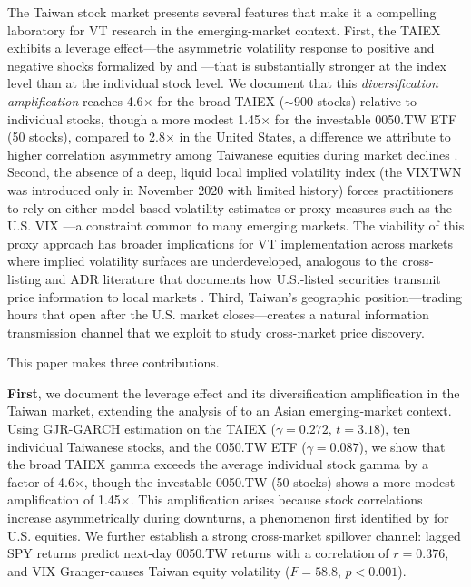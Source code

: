 The Taiwan stock market presents several features that make it a compelling laboratory for VT research in the emerging-market context. First, the TAIEX exhibits a leverage effect---the asymmetric volatility response to positive and negative shocks formalized by \citet{black1976} and \citet{glosten1993}---that is substantially stronger at the index level than at the individual stock level. We document that this \textit{diversification amplification} reaches 4.6$\times$ for the broad TAIEX ($\sim$900 stocks) relative to individual stocks, though a more modest 1.45$\times$ for the investable 0050.TW ETF (50 stocks), compared to 2.8$\times$ in the United States, a difference we attribute to higher correlation asymmetry among Taiwanese equities during market declines \citep{ang2002}. Second, the absence of a deep, liquid local implied volatility index (the VIXTWN was introduced only in November 2020 with limited history) forces practitioners to rely on either model-based volatility estimates or proxy measures such as the U.S. VIX \citep{whaley2000,whaley2009}---a constraint common to many emerging markets. The viability of this proxy approach has broader implications for VT implementation across markets where implied volatility surfaces are underdeveloped, analogous to the cross-listing and ADR literature that documents how U.S.-listed securities transmit price information to local markets \citep{gagnon2010}. Third, Taiwan's geographic position---trading hours that open after the U.S. market closes---creates a natural information transmission channel \citep{eun1989,hamao1990,lin1994} that we exploit to study cross-market price discovery.

This paper makes three contributions.

\textbf{First}, we document the leverage effect and its diversification amplification in the Taiwan market, extending the analysis of \citet{ang2002} to an Asian emerging-market context. Using GJR-GARCH estimation on the TAIEX ($\gamma = 0.272$, $t = 3.18$), ten individual Taiwanese stocks, and the 0050.TW ETF ($\gamma = 0.087$), we show that the broad TAIEX gamma exceeds the average individual stock gamma by a factor of 4.6$\times$, though the investable 0050.TW (50 stocks) shows a more modest amplification of 1.45$\times$. This amplification arises because stock correlations increase asymmetrically during downturns, a phenomenon first identified by \citet{ang2002} for U.S. equities. We further establish a strong cross-market spillover channel: lagged SPY returns predict next-day 0050.TW returns with a correlation of $r = 0.376$, and VIX Granger-causes Taiwan equity volatility ($F = 58.8$, $p < 0.001$).

